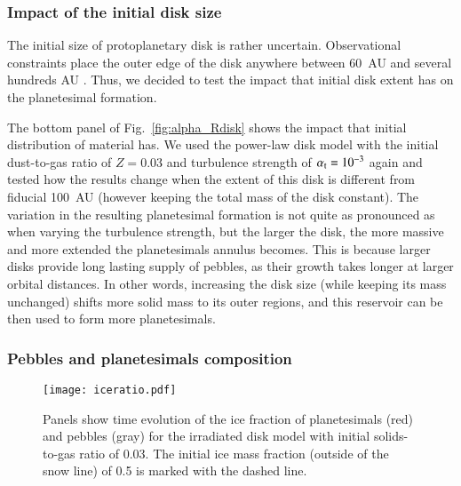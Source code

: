 \documentclass{aa}
\begin{document}
\subsubsection{Impact of the initial disk size}

The initial size of protoplanetary disk is rather uncertain. Observational constraints place the outer edge of the disk anywhere between 60~AU and several hundreds AU \citep{2009ApJ...700.1502A,2010ApJ...723.1241A}. Thus, we decided to test the impact that initial disk extent has on the planetesimal formation.

The bottom panel of Fig.~\ref{fig:alpha_Rdisk} shows the impact that initial distribution of material has. We used the power-law disk model with the initial dust-to-gas ratio of $Z=0.03$ and turbulence strength of $\alpha_{\rm t}=10^{-3}$ again and tested how the results change when the extent of this disk is different from fiducial 100~AU (however keeping the total mass of the disk constant). The variation in the resulting planetesimal formation is not quite as pronounced as when varying the turbulence strength, but the larger the disk, the more massive and more extended the planetesimals annulus becomes. This is because larger disks provide long lasting supply of pebbles, as their growth takes longer at larger orbital distances. In other words, increasing the disk size (while keeping its mass unchanged) shifts more solid mass to its outer regions, and this reservoir can be then used to form more planetesimals.

\subsubsection{Pebbles and planetesimals composition}

  \begin{figure}
   \centering
   \texttt{[image: iceratio.pdf]}
      \caption{Panels show time evolution of the ice fraction of planetesimals (red) and pebbles (gray) for the irradiated disk model with initial solids-to-gas ratio of 0.03. The initial ice mass fraction (outside of the snow line) of 0.5 is marked with the dashed line.}
      \label{fig:iceratio}
\end{figure}
\end{document}
